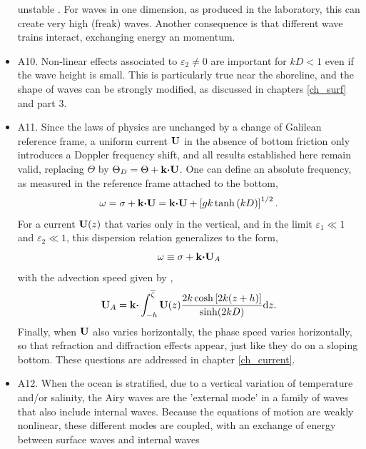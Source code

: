 \begin{itemize}
unstable \citep{Benjamin&Feir1967}. For waves in one dimension, as produced in the laboratory, 
this can create very high (freak) waves. Another consequence is that different wave trains interact, 
exchanging energy an momentum.\vspace{0.3cm}
 \item A10. Non-linear effects associated to  $\varepsilon_2 \neq 0$ are important for $kD<1$ even if the wave height is small. 
This is particularly true near the shoreline, and the shape of waves can be strongly modified, as discussed in chapters \ref{ch_surf} and 
part 3.\vspace{0.3cm}
 \item A11. Since the laws of physics are unchanged by a change of Galilean reference frame, 
a uniform current $\mathbf{U}$ in the absence of bottom friction only introduces a Doppler frequency shift, 
and all results established here remain valid, replacing 
$\Theta$ by $\Theta_D=\Theta+\mathbf{k} \mbox{\boldmath $\cdot$}
 \mathbf{U}$. One can define an absolute frequency, as measured in the reference frame attached to the bottom, 
 \begin{equation}
    \omega=\sigma+\mathbf{k} \mbox{\boldmath $\cdot$} \mathbf{U} =\mathbf{k} \mbox{\boldmath $\cdot$} \mathbf{U} + \left[g k \tanh\left(kD\right)\right]^{1/2}.
     \label{dispersionD}
\end{equation}
For a current   $\mathbf{U}(z)$ that varies only in the vertical, and in the limit  $\varepsilon_1 \ll 1$  and $\varepsilon_2 \ll 1$, 
this dispersion relation generalizes to the form,
 \begin{equation}
    \omega\equiv\sigma+\mathbf{k} \mbox{\boldmath $\cdot$} \mathbf{U}_A      \label{dispersionD2}
\end{equation}
with the advection speed given by \cite{Kirby&Chen1989}, 
 \begin{equation}
 \mathbf{U}_A   = \mathbf{k} \mbox{\boldmath $\cdot$} \int_{-h}^{\overline{\zeta}} \mathbf{U}(z) \frac{2  k
\cosh\left[2k(z+h)\right]}{\sinh(2kD)} \mathrm{d} z. \label{dispersionD3}
\end{equation}
Finally, when $\mathbf{U}$ also varies horizontally, the phase speed varies horizontally, so that refraction and diffraction effects 
appear, just like they do on a sloping bottom. These questions are addressed  in  chapter \ref{ch_current}.\vspace{0.3cm}
\item A12. When the ocean is stratified, due to a vertical variation of temperature and/or salinity, the Airy waves are the 'external mode' in a family of waves that also include internal waves. 
Because the equations of motion are weakly nonlinear, these different modes are coupled, with an exchange of energy between surface waves and internal waves 

\end{itemize}
